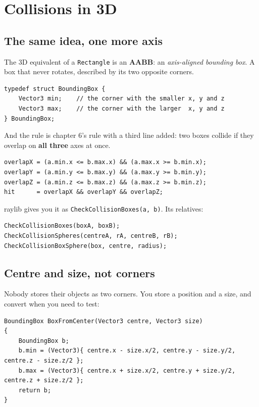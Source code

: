 \chapter{Collisions in 3D}

\section{The same idea, one more axis}

The 3D equivalent of a \lstinline|Rectangle| is an \textbf{AABB}: an
\emph{axis-aligned bounding box}. A box that never rotates, described by its two
opposite corners.

\begin{lstlisting}
typedef struct BoundingBox {
    Vector3 min;    // the corner with the smaller x, y and z
    Vector3 max;    // the corner with the larger  x, y and z
} BoundingBox;
\end{lstlisting}

And the rule is chapter 6's rule with a third line added: two boxes collide if
they overlap on \textbf{all three} axes at once.

\begin{lstlisting}
overlapX = (a.min.x <= b.max.x) && (a.max.x >= b.min.x);
overlapY = (a.min.y <= b.max.y) && (a.max.y >= b.min.y);
overlapZ = (a.min.z <= b.max.z) && (a.max.z >= b.min.z);
hit      = overlapX && overlapY && overlapZ;
\end{lstlisting}

raylib gives you it as \lstinline|CheckCollisionBoxes(a, b)|. Its relatives:

\begin{lstlisting}
CheckCollisionBoxes(boxA, boxB);
CheckCollisionSpheres(centreA, rA, centreB, rB);
CheckCollisionBoxSphere(box, centre, radius);
\end{lstlisting}

\section{Centre and size, not corners}

Nobody stores their objects as two corners. You store a position and a size, and
convert when you need to test:

\begin{lstlisting}
BoundingBox BoxFromCenter(Vector3 centre, Vector3 size)
{
    BoundingBox b;
    b.min = (Vector3){ centre.x - size.x/2, centre.y - size.y/2, centre.z - size.z/2 };
    b.max = (Vector3){ centre.x + size.x/2, centre.y + size.y/2, centre.z + size.z/2 };
    return b;
}
\end{lstlisting}

